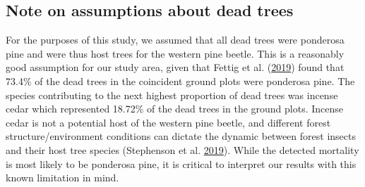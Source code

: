 \documentclass[twoside,12pt,final]{ucthesis-CA2012}
\begin{document}
\begin{ucmainmatter}
\subsection{Note on assumptions about dead
trees}\label{note-on-assumptions-about-dead-trees}

For the purposes of this study, we assumed that all dead trees were
ponderosa pine and were thus host trees for the western pine beetle.
This is a reasonably good assumption for our study area, given that
Fettig et al. (\protect\hyperlink{ref-fettig2019}{2019}) found that
73.4\% of the dead trees in the coincident ground plots were ponderosa
pine. The species contributing to the next highest proportion of dead
trees was incense cedar which represented 18.72\% of the dead trees in
the ground plots. Incense cedar is not a potential host of the western
pine beetle, and different forest structure/environment conditions can
dictate the dynamic between forest insects and their host tree species
(Stephenson et al. \protect\hyperlink{ref-stephenson2019}{2019}). While
the detected mortality is most likely to be ponderosa pine, it is
critical to interpret our results with this known limitation in mind.


\end{ucmainmatter}
\end{document}
